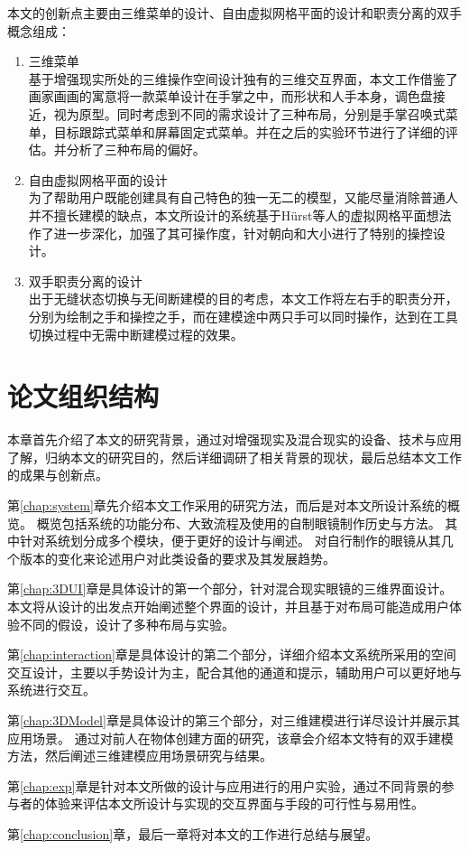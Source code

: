 本文的创新点主要由三维菜单的设计、自由虚拟网格平面的设计和职责分离的双手概念组成：
\begin{enumerate}
\item 三维菜单\hfill\\
基于增强现实所处的三维操作空间设计独有的三维交互界面，本文工作借鉴了画家画画的寓意将一款菜单设计在手掌之中，而形状和人手本身，调色盘接近，视为原型。同时考虑到不同的需求设计了三种布局，分别是手掌召唤式菜单，目标跟踪式菜单和屏幕固定式菜单。并在之后的实验环节进行了详细的评估。并分析了三种布局的偏好。
\item 自由虚拟网格平面的设计\hfill\\
为了帮助用户既能创建具有自己特色的独一无二的模型，又能尽量消除普通人并不擅长建模的缺点，本文所设计的系统基于H{\"u}rst等人的虚拟网格平面想法作了进一步深化，加强了其可操作度，针对朝向和大小进行了特别的操控设计。
\item 双手职责分离的设计\hfill\\
出于无缝状态切换与无间断建模的目的考虑，本文工作将左右手的职责分开，分别为绘制之手和操控之手，而在建模途中两只手可以同时操作，达到在工具切换过程中无需中断建模过程的效果。
\end{enumerate}

\section{论文组织结构}
本章首先介绍了本文的研究背景，通过对增强现实及混合现实的设备、技术与应用了解，归纳本文的研究目的，然后详细调研了相关背景的现状，最后总结本文工作的成果与创新点。

第\ref{chap:system}章先介绍本文工作采用的研究方法，而后是对本文所设计系统的概览。
概览包括系统的功能分布、大致流程及使用的自制眼镜制作历史与方法。
其中针对系统划分成多个模块，便于更好的设计与阐述。
对自行制作的眼镜从其几个版本的变化来论述用户对此类设备的要求及其发展趋势。

第\ref{chap:3DUI}章是具体设计的第一个部分，针对混合现实眼镜的三维界面设计。本文将从设计的出发点开始阐述整个界面的设计，并且基于对布局可能造成用户体验不同的假设，设计了多种布局与实验。

第\ref{chap:interaction}章是具体设计的第二个部分，详细介绍本文系统所采用的空间交互设计，主要以手势设计为主，配合其他的通道和提示，辅助用户可以更好地与系统进行交互。

第\ref{chap:3DModel}章是具体设计的第三个部分，对三维建模进行详尽设计并展示其应用场景。
通过对前人在物体创建方面的研究，该章会介绍本文特有的双手建模方法，然后阐述三维建模应用场景研究与结果。

第\ref{chap:exp}章是针对本文所做的设计与应用进行的用户实验，通过不同背景的参与者的体验来评估本文所设计与实现的交互界面与手段的可行性与易用性。

第\ref{chap:conclusion}章，最后一章将对本文的工作进行总结与展望。